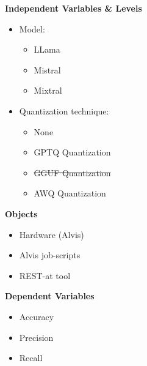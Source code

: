 \documentclass[conference]{IEEEtran}
\begin{document}
\begin{figure}[h]
\begin{center}
    \begin{tcbraster}[raster columns=2, raster column skip=5pt, raster equal height=rows, raster row skip=5pt]
        \begin{roundedBox}
            \centering
            \textbf{Independent Variables \& Levels}
            \begin{itemize}
                \item Model:
                \begin{itemize}
                    \item LLama
                    \item Mistral
                    \item Mixtral
                \end{itemize}
                \item Quantization technique:
                \begin{itemize}
                    \item None
                    \item GPTQ Quantization
                    \item \st{GGUF Quantization}
                    \item AWQ Quantization
                \end{itemize}
            \end{itemize}
        \end{roundedBox}
        \begin{roundedBox}
            \centering
            \textbf{Objects}
            \begin{itemize}
                \item Hardware (Alvis)
                \item Alvis job-scripts
                \item REST-at tool
            \end{itemize}
        \end{roundedBox}
        \begin{roundedBox}
            \centering
            \textbf{Dependent Variables}
            \begin{itemize}
                \item Accuracy
                \item Precision
                \item Recall

\end{itemize}
\end{roundedBox}
\end{tcbraster}
\end{center}
\end{figure}
\end{document}
